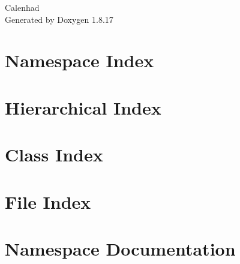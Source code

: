 \let\mypdfximage\pdfximage\def\pdfximage{\immediate\mypdfximage}\documentclass[twoside]{book}
\newcommand{\+}{\discretionary{\mbox{\scriptsize$\hookleftarrow$}}{}{}}
\newcommand{\clearemptydoublepage}{%
  \newpage{\pagestyle{empty}\cleardoublepage}%
}
\begin{document}
\hypersetup{pageanchor=false,
             bookmarksnumbered=true,
             pdfencoding=unicode
            }
\begin{titlepage}
\vspace*{7cm}
\begin{center}%
{\Large Calenhad }\\
\vspace*{1cm}
{\large Generated by Doxygen 1.8.17}\\
\end{center}
\end{titlepage}
\clearemptydoublepage
{}
\tableofcontents
\clearemptydoublepage
{}
\hypersetup{pageanchor=true}

\chapter{Namespace Index}

\chapter{Hierarchical Index}

\chapter{Class Index}

\chapter{File Index}

\chapter{Namespace Documentation}




























\end{document}

